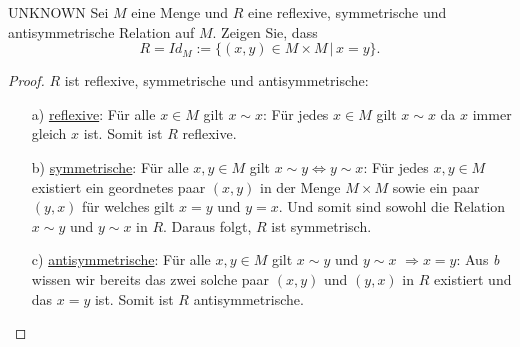 \documentclass{problemset}
\begin{document}
\begin{problem}{UNKNOWN}
Sei $M$ eine Menge und $R$ eine reflexive, symmetrische und antisymmetrische Relation auf $M$. Zeigen Sie, dass \[
    R = Id_M := \{(x,y) \in M \times M\,|\,x=y \}.
\]
\begin{proof} $R$ ist reflexive, symmetrische und antisymmetrische:
    \begin{enumerate}
        \item [a)] \underline{reflexive}: Für alle $x \in M$ gilt $x \sim x$: \newline
              Für jedes $x \in M$ gilt $x \sim x$ da $x$ immer gleich $x$ ist.
              \newline\newline
              Somit ist $R$ reflexive.
        \item [b)] \underline{symmetrische}: Für alle $x, y \in M$ gilt $x \sim y \Leftrightarrow y \sim x$: \newline
              Für jedes $x,y \in M$ existiert ein geordnetes paar $(x,y)$ in der Menge $M \times M$ sowie ein paar $(y, x)$ für welches gilt $x = y$ und $y = x$.
              Und somit sind sowohl die Relation $x \sim y$ und $y \sim x$ in $R$. Daraus folgt, $R$ ist symmetrisch.
        \item [c)] \underline{antisymmetrische}: Für alle $x, y \in M$ gilt $x \sim y$ und $y \sim x$ $\Rightarrow x = y$: \newline
              Aus \textit{b} wissen wir bereits das zwei solche paar $(x,y)$ und $(y, x)$ in $R$ existiert und das $x = y$ ist.
              Somit ist $R$ antisymmetrische.
    \end{enumerate}
\end{proof}
\end{problem}
\end{document}
